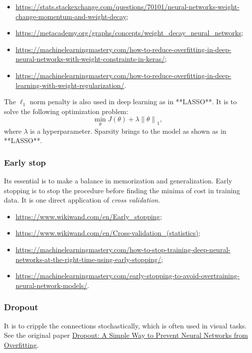 \documentclass[titlestyle=hang,11pt]{elegantbook}
\begin{document}
\begin{itemize}
  \item \url{https://stats.stackexchange.com/questions/70101/neural-networks-weight-change-momentum-and-weight-decay};
  \item \url{https://metacademy.org/graphs/concepts/weight_decay_neural_networks};
  \item \url{https://machinelearningmastery.com/how-to-reduce-overfitting-in-deep-neural-networks-with-weight-constraints-in-keras/};
  \item \url{https://machinelearningmastery.com/how-to-reduce-overfitting-in-deep-learning-with-weight-regularization/}.
\end{itemize}

The $\ell_1$ norm penalty is also used in deep learning as in **LASSO**. It is to solve the following optimization problem:
  $$\min_{\theta}J(\theta)+\lambda{\|\theta\|}_1, $$
where $\lambda$ is a hyperparameter. Sparsity  brings to the model as shown as in **LASSO**.

\subsubsection{Early stop}

Its essential is to make a balance in memorization and generalization.
Early stopping is to stop the procedure before finding the minima of cost in training data. 
It is one direct application of \emph{cross validation}.

\begin{itemize}
	\item \url{ https://www.wikiwand.com/en/Early_stopping};
	\item \url{https://www.wikiwand.com/en/Cross-validation_(statistics)};
	\item \url{https://machinelearningmastery.com/how-to-stop-training-deep-neural-networks-at-the-right-time-using-early-stopping/};
	\item \url{https://machinelearningmastery.com/early-stopping-to-avoid-overtraining-neural-network-models/}.
\end{itemize}


\subsubsection{Dropout}

It is to cripple the connections stochastically, which  is often used in visual tasks. 
See the original paper \href{http://www.cs.toronto.edu/~hinton/absps/JMLRdropout.pdf}{Dropout: A Simple Way to Prevent Neural Networks from Overfitting}.
\end{document}
